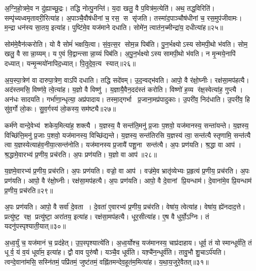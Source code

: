अ॒ग्नि॒हो॒त्रमे॒व न दु॑ह्याच्छू॒द्रः।
तद्धि नोत्पु॒नन्ति॑।
य॒दा खलु॒ वै प॒वित्र॑म॒त्येति॑।
अथ॒ तद्ध॒विरिति॑।
सम्पृ॑च्यध्वमृतावरी॒रित्या॑ह।
अ॒पाञ्चै॒वौष॑धीनां च॒ रस॒ स सृ॑जति।
तस्मा॑द॒पाञ्चौष॑धीनां च॒ रस॒मुप॑जीवामः।
म॒न्द्रा धन॑स्य सा॒तय॒ इत्या॑ह।
पुष्टि॑मे॒व यज॑माने दधाति।
सोमे॑न॒ त्वात॑न॒च्मीन्द्रा॑य॒ दधीत्या॑ह॥२५॥

सोम॑मे॒वैन॑त्करोति।
यो वै सोमं॑ भक्षयि॒त्वा।
सं॒व॒त्स॒र सोम॒न्न पिब॑ति।
पु॒न॒र्भक्ष्योऽस्य सोमपी॒थो भ॑वति।
सोम॒ खलु॒ वै सान्ना॒य्यम्।
य ए॒वं वि॒द्वान्त्सान्ना॒य्यं पिब॑ति।
अ॒पु॒न॒र्भक्ष्योऽस्य सामपी॒थो भ॑वति।
न मृ॒न्मये॒नापि॑ दध्यात्।
यन्मृ॒न्मयो॑नापिद॒ध्यात्।
पि॒तृ॒दे॒व॒त्य स्यात्॥२६॥

अ॒य॒स्पा॒त्रेण॑ वा दारुपा॒त्रेण॒ वाऽपि॑ दधाति।
तद्धि सदे॑वम्।
उ॒द॒न्वद्भ॑वति।
आपो॒ वै र॑क्षो॒घ्नीः।
रक्ष॑सा॒मप॑हत्यै।
अद॑स्तमसि॒ विष्ण॑वे॒ त्वे॒त्या॑ह।
य॒ज्ञो वै विष्णु॑।
य॒ज्ञायै॒वैन॒दद॑स्तं करोति।
विष्णो॑ ह॒व्य र॑क्ष॒स्वेत्या॑ह॒ गुप्त्यै।
अन॑धः सादयति।
गर्भा॑णा॒न्धृत्या॒ अप्र॑पादाय।
तस्मा॒द्गर्भा प्र॒जाना॒मप्र॑पादुकाः।
उ॒परी॑व॒ निद॑धाति।
उ॒परी॑व॒ हि सु॑व॒र्गो लो॒कः।
सु॒व॒र्गस्य॑ लो॒कस्य॒ सम॑ष्ट्यै॥२७॥

कर्म॑णे वान्दे॒वेभ्य॑ शकेय॒मित्या॑ह॒ शक्त्यै।
य॒ज्ञस्य॒ वै सन्त॑ति॒मनु॑ प्र॒जाः प॒शवो॒ यज॑मानस्य॒ सन्ता॑यन्ते।
य॒ज्ञस्य॒ विच्छि॑त्ति॒मनु॑ प्र॒जाः प॒शवो॒ यज॑मानस्य॒ विच्छि॑द्यन्ते।
य॒ज्ञस्य॒ सन्त॑तिरसि य॒ज्ञस्य॑ त्वा॒ सन्त॑त्यै स्तृणामि॒ सन्त॑त्यै त्वा य॒ज्ञस्येत्याह॑व॒नीया॒त्सन्त॑नोति।
यज॑मानस्य प्र॒जायै॑ पशू॒ना सन्त॑त्यै।
अ॒पः प्रण॑यति।
श्र॒द्धा वा आप॑।
श्र॒द्धामे॒वारभ्य॑ प्र॒णीय॒ प्रच॑रति।
अ॒पः प्रण॑यति।
य॒ज्ञो वा आप॑॥२८॥

य॒ज्ञमे॒वारभ्य॑ प्र॒णीय॒ प्रच॑रति।
अ॒पः प्रण॑यति।
वज्रो॒ वा आप॑।
वज्र॑मे॒व भ्रातृ॑व्येभ्यः प्र॒हृत्य॑ प्र॒णीय॒ प्रच॑रति।
अ॒पः प्रण॑यति।
आपो॒ वै र॑क्षो॒घ्नीः।
रक्ष॑सा॒मप॑हत्यै।
अ॒पः प्रण॑यति।
आपो॒ वै दे॒वानां प्रि॒यन्धाम॑।
दे॒वाना॑मे॒व प्रि॒यन्धाम॑ प्र॒णीय॒ प्रच॑रति॥२९॥

अ॒पः प्रण॑यति।
आपो॒ वै सर्वा॑ दे॒वता।
दे॒वता॑ ए॒वारभ्य॑ प्र॒णीय॒ प्रच॑रति।
वेषा॑य॒ त्वेत्या॑ह।
वेषा॑य॒ ह्ये॑नदाद॒त्ते।
प्रत्यु॑ष्ट॒ रक्ष॒ प्रत्यु॑ष्टा॒ अरा॑तय॒ इत्या॑ह।
रक्ष॑सा॒मप॑हत्यै।
धूर॒सीत्या॑ह।
ए॒ष वै धुर्यो॒ऽग्निः।
तं यदनु॑पस्पृश्याती॒यात्॥३०॥

अ॒ध्व॒र्युं च॒ यज॑मानं च॒ प्रद॑हेत्।
उ॒प॒स्पृश्यात्ये॑ति।
अ॒ध्व॒र्योश्च॒ यज॑मानस्य॒ चाप्र॑दाहाय।
धूर्व॒ तं योस्मान्धूर्व॑ति॒ तं धूर्व॒ यं व॒यं धूर्वा॑म॒ इत्या॑ह।
द्वौ वाव पुरु॑षौ।
यञ्चै॒व धूर्व॑ति।
यश़्चै॑न॒न्धूर्व॑ति।
तावु॒भौ शु॒चाऽर्प॑यति।
त्वन्दे॒वाना॑मसि॒ सस्नि॑तमं॒ पप्रि॑तमं॒ जुष्ट॑तमं॒ वह्नि॑तमन्देव॒हूत॑म॒मित्या॑ह।
य॒था॒य॒जुरे॒वैतत्॥३१॥

